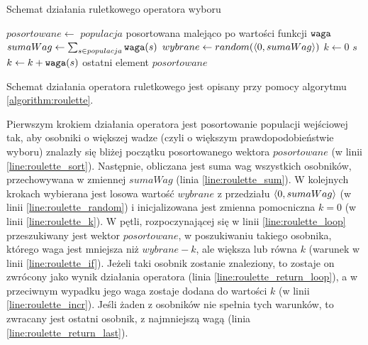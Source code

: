 \documentclass[./FM_mgr.tex]{subfiles}
\begin{document}
\begin{algorithm}[h]
	\caption{Schemat działania ruletkowego operatora wyboru \label{algorithm:roulette}}
	\begin{algorithmic}[1]
		\Start
		\Var \label{line:roulette_sort} 
		$posortowane \gets$ $populacja$ posortowana malejąco po wartości funkcji $\mathtt{waga}$
		\Var \label{line:roulette_sum} 
		$sumaWag \gets \sum_{s \in populacja} \mathtt{waga}(s)$
		\Var \label{line:roulette_random} 
		$wybrane \gets random(\langle0, sumaWag\rangle)$
		\Var \label{line:roulette_k} 
		$k \gets 0$
		 \label{line:roulette_loop} 
		\label{line:roulette_if} 
		\State \Return $s$ \label{line:roulette_return_loop} 
		\Else
		\State $k \gets k + \mathtt{waga}(s)$ \label{line:roulette_incr} 
		\EndIf
		\EndFor
		\State \Return ostatni element $posortowane$ \label{line:roulette_return_last} 
		\EndOperator
	\end{algorithmic}
\end{algorithm}

Schemat działania operatora ruletkowego jest opisany przy pomocy algorytmu \ref{algorithm:roulette}.

Pierwszym krokiem działania operatora jest posortowanie populacji wejściowej tak, aby osobniki o większej wadze (czyli o większym prawdopodobieństwie wyboru) znalazły się bliżej początku posortowanego wektora $posortowane$ (w linii \ref{line:roulette_sort}).
Następnie, obliczana jest suma wag wszystkich osobników, przechowywana w zmiennej $sumaWag$ (linia \ref{line:roulette_sum}).
W kolejnych krokach wybierana jest losowa wartość $wybrane$ z przedziału $\langle0, sumaWag\rangle$ (w linii \ref{line:roulette_random}) i inicjalizowana jest zmienna pomocniczna $k=0$ (w linii \ref{line:roulette_k}).
W pętli, rozpoczynającej się w linii \ref{line:roulette_loop} przeszukiwany jest wektor $posortowane$, w poszukiwaniu takiego osobnika, którego waga jest mniejsza niż $wybrane-k$, ale większa lub równa $k$ (warunek w linii \ref{line:roulette_if}). 
Jeżeli taki osobnik zostanie znaleziony, to zostaje on zwrócony jako wynik działania operatora (linia \ref{line:roulette_return_loop}), a w przeciwnym wypadku jego waga zostaje dodana do wartości $k$ (w linii \ref{line:roulette_incr}).
Jeśli żaden z osobników nie spełnia tych warunków, to zwracany jest ostatni osobnik, z najmniejszą wagą (linia \ref{line:roulette_return_last}).
\end{document}
